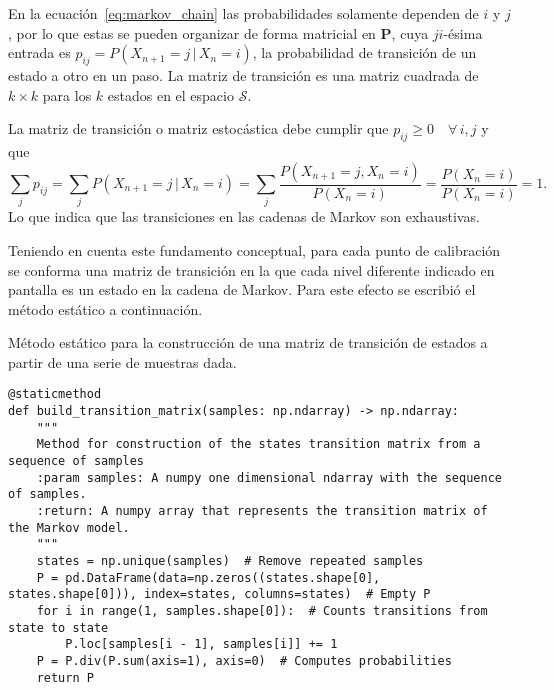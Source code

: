 En la ecuación~\eqref{eq:markov_chain} las probabilidades solamente dependen de $i$ y $j$, por lo que estas se pueden organizar de forma matricial en $\mathbf{P}$, cuya $ji$-ésima entrada es $p_{ij} = P\left(X_{n + 1} = j\,|\,X_n = i\right)$, la probabilidad de transición de un estado a otro en un paso.
La matriz de transición es una matriz cuadrada de $k \times k$ para los $k$ estados en el espacio $\mathcal{S}$.

La matriz de transición o matriz estocástica debe cumplir que $p_{ij} \ge 0 \quad \forall\,i,j$ y que
%
\begin{equation*}
    \sum_j p_{ij} = \sum_j P\left(X_{n + 1} = j\,|\,X_n = i\right)
    = \sum_j \frac{P\left(X_{n + 1} = j, X_n = i\right)}{P\left(X_n = i\right)}
    = \frac{P\left(X_n = i\right)}{P\left(X_n = i\right)} = 1.
\end{equation*}
%
Lo que indica que las transiciones en las cadenas de Markov son exhaustivas.

Teniendo en cuenta este fundamento conceptual, para cada punto de calibración se conforma una matriz de transición en la que cada nivel diferente indicado en pantalla es un estado en la cadena de Markov.
Para este efecto se escribió el método estático a continuación.
\vfill
\pagebreak

\begin{code}
    \caption{Método estático para la construcción de una matriz de transición de estados a partir de una serie de muestras dada.}
    \label{code:build_transition_matrix}
    \centering
    \begin{verbatim}
@staticmethod
def build_transition_matrix(samples: np.ndarray) -> np.ndarray:
    """
    Method for construction of the states transition matrix from a sequence of samples
    :param samples: A numpy one dimensional ndarray with the sequence of samples.
    :return: A numpy array that represents the transition matrix of the Markov model.
    """
    states = np.unique(samples)  # Remove repeated samples
    P = pd.DataFrame(data=np.zeros((states.shape[0], states.shape[0])), index=states, columns=states)  # Empty P
    for i in range(1, samples.shape[0]):  # Counts transitions from state to state
        P.loc[samples[i - 1], samples[i]] += 1
    P = P.div(P.sum(axis=1), axis=0)  # Computes probabilities
    return P
    \end{verbatim}
\end{code}


